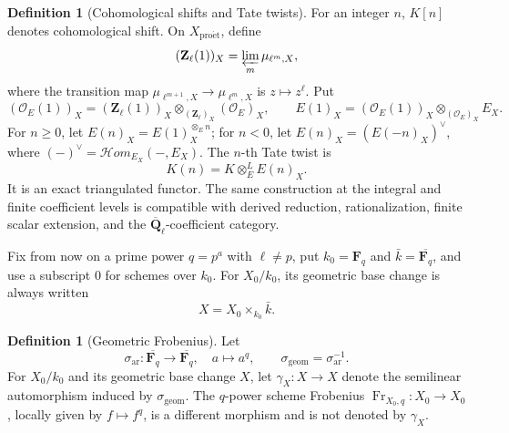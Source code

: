\documentclass[10pt]{article}
\theoremstyle{definition}
\newtheorem{definition}[theorem]{Definition}
\newcommand{\Fq}{\mathbf F_q}
\newcommand{\Zl}{\mathbf Z_\ell}
\newcommand{\Qlb}{\overline{\mathbf Q}_\ell}
\newcommand{\OO}{\mathcal O}
\begin{document}
\begin{definition}[Cohomological shifts and Tate twists]
For an integer \(n\), \(K[n]\) denotes cohomological shift.  On
\(X_{\mathrm{pro\acute et}}\), define
\[
 (\Zl(1))_X=\varprojlim_m\mu_{\ell^m,X},
\]
where the transition map
\(\mu_{\ell^{m+1},X}\to\mu_{\ell^m,X}\) is \(z\mapsto z^\ell\).  Put
\[
 (\OO_E(1))_X=(\Zl(1))_X
   \otimes_{(\Zl)_X}(\OO_E)_X,
 \qquad
 E(1)_X=(\OO_E(1))_X\otimes_{(\OO_E)_X}E_X.
\]
For \(n\geq0\), let \(E(n)_X=E(1)_X^{\otimes_E n}\); for \(n<0\), let
\(E(n)_X=(E(-n)_X)^\vee\), where
\((-)^\vee=\mathcal Hom_{E_X}(-,E_X)\).  The \(n\)-th Tate twist is
\[
 K(n)=K\otimes_E^LE(n)_X.
\]
It is an exact triangulated functor.  The same construction at the integral
and finite coefficient levels is compatible with derived reduction,
rationalization, finite scalar extension, and the \(\Qlb\)-coefficient
category.
\end{definition}

Fix from now on a prime power \(q=p^a\) with \(\ell\ne p\), put
\(k_0=\Fq\) and \(\bar k=\overline{\Fq}\), and use a subscript \(0\) for
schemes over \(k_0\).  For \(X_0/k_0\), its geometric base change is always
written
\[
 X=X_0\times_{k_0}\bar k.
\]

\begin{definition}[Geometric Frobenius]
Let
\[
 \sigma_{\mathrm{ar}}:\overline{\Fq}\longrightarrow\overline{\Fq},
 \quad a\longmapsto a^q,
 \qquad
 \sigma_{\mathrm{geom}}=\sigma_{\mathrm{ar}}^{-1}.
\]
For \(X_0/k_0\) and its geometric base change \(X\), let
\(\gamma_X:X\to X\) denote the semilinear automorphism induced by
\(\sigma_{\mathrm{geom}}\).  The \(q\)-power scheme Frobenius
\(\operatorname{Fr}_{X_0,q}:X_0\to X_0\), locally given by
\(f\mapsto f^q\), is a different morphism and is not denoted by
\(\gamma_X\).
\end{definition}
\end{document}
